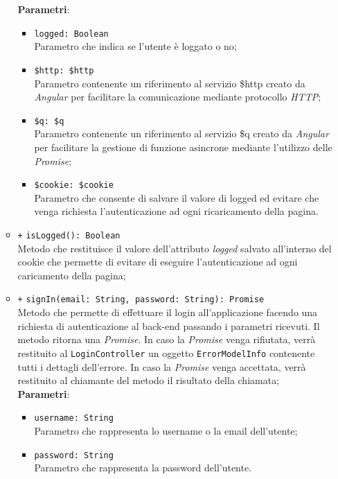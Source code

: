 \begin{itemize}
\begin{itemize}
		\textbf{Parametri}:
		\begin{itemize}
			\item \texttt{logged: Boolean} \\ Parametro che indica se l'utente è loggato o no;
			\item \texttt{\$http: \$http} \\ Parametro contenente un riferimento al servizio \$http creato da \textit{Angular} per facilitare la comunicazione mediante protocollo \textit{HTTP};
			\item \texttt{\$q: \$q} \\ Parametro contenente un riferimento al servizio \$q creato da \textit{Angular} per facilitare la gestione di funzione asincrone mediante l’utilizzo delle \textit{Promise};
			\item \texttt{\$cookie: \$cookie} \\ Parametro che consente di salvare il valore di logged ed evitare che venga richiesta l'autenticazione ad ogni ricaricamento della pagina.
		\end{itemize}
		\item \texttt{+} \texttt{isLogged(): Boolean} \\ Metodo che restituisce il valore dell'attributo \textit{logged} salvato all'interno del cookie che permette di evitare di eseguire l'autenticazione ad ogni caricamento della pagina;
		 
		\item \texttt{+} \texttt{signIn(email: String, password: String): Promise}\\ Metodo che permette di effettuare il login all'applicazione facendo una richiesta di autenticazione al back-end passando i parametri ricevuti. Il metodo ritorna una \textit{Promise}. In caso la \textit{Promise} venga rifiutata, verrà restituito al \texttt{LoginController} un oggetto \texttt{ErrorModelInfo} contenente tutti i dettagli dell'errore. In caso la \textit{Promise} venga accettata, verrà restituito al chiamante del metodo il risultato della chiamata; \\
			\textbf{Parametri}: 
			\begin{itemize}
				\item \texttt{username: String} \\ Parametro che rappresenta lo username o la email dell'utente;
				\item \texttt{password: String} \\ Parametro che rappresenta la password dell'utente.
			\end{itemize}
			

\end{itemize}
\end{itemize}
